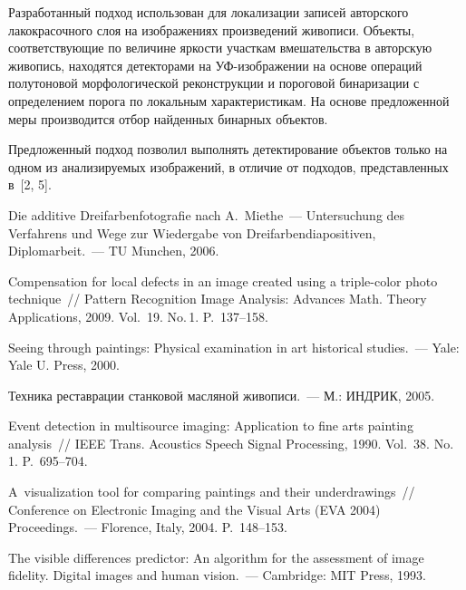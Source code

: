 \begin{multicols}{2}
Разработанный подход использован для локализации записей 
авторского лакокрасочного слоя на изображениях произведений живописи. Объекты, 
соответствующие по величине яркости участкам вмешательства в авторскую живопись, 
находятся детекторами на УФ-изоб\-ра\-же\-нии на основе операций полутоновой 
морфологической реконструкции и пороговой бинаризации с определением порога по 
локальным характеристикам. На основе предложенной меры производится отбор найденных 
бинарных объектов. 

Предложенный подход позволил выполнять детектирование объектов 
только на одном из анализируемых изображений, в отличие от подходов, представленных 
в~[2, 5].

{\small\frenchspacing
{%
\begin{thebibliography}{99}

Die additive Dreifarbenfotografie nach A.~Miethe~--- Untersuchung des Verfahrens und Wege zur 
Wiedergabe von Dreifarbendiapositiven, Diplomarbeit.~--- TU M$\ddot{\mbox{u}}$nchen, 2006.

Compensation for local defects in an image created using a triple-color photo technique~// Pattern 
Recognition Image Analysis: Advances Math. Theory Applications, 2009. 
Vol.~19. No.\,1. P.~137--158.

Seeing through paintings: Physical examination in art historical studies.~--- Yale: Yale U. Press, 
2000.

Техника реставрации станковой масляной живописи.~--- М.: ИНДРИК, 2005.

Event detection in multisource imaging: Application to fine arts painting analysis~// IEEE 
Trans. Acoustics Speech Signal Processing, 1990. Vol.~38. No.\,1. P.~695--704.

A~visualization tool for comparing paintings and their underdrawings~// Conference on Electronic 
Imaging and the Visual Arts (EVA 2004) Proceedings.~--- Florence, Italy, 2004. P.~148--153.

 The visible differences predictor: An algorithm for the assessment of image fidelity. Digital images 
and human vision.~--- Cambridge: MIT Press, 1993.


\end{thebibliography}}}
\end{multicols}
